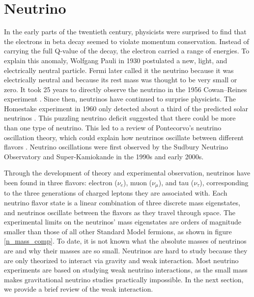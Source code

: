 \section{Neutrino}
In the early parts of the twentieth century, physicists were surprised to find that the electrons in beta decay seemed to violate momentum conservation. Instead of carrying the full Q-value of the decay, the electron carried a range of energies. To explain this anomaly, Wolfgang Pauli in 1930 postulated a new, light, and electrically neutral particle. Fermi later called it the neutrino because it was electrically neutral and because its rest mass was thought to be very small or zero. It took 25 years to directly observe the neutrino in the 1956 Cowan–Reines experiment \cite{PhysRev.92.830}. Since then, neutrinos have continued to surprise physicists. The Homestake experiment in 1960 only detected about a third of the predicted solar neutrinos \cite{Cleveland:1998nv}. This puzzling neutrino deficit suggested that there could be more than one type of neutrino. This led to a review of Pontecorvo's neutrino oscillation theory, which could explain how neutrinos oscillate between different flavors \cite{Pontecorvo:1967fh}. Neutrino oscillations were first observed by the Sudbury Neutrino Observatory \cite{SNO:2001kpb} and Super-Kamiokande \cite{Super_Kamiokande_1998kpq} in the 1990s and early 2000s. 

Through the development of theory and experimental observation, neutrinos have been found in three flavors: electron ($\nu_e$), muon ($\nu_{\mu}$), and tau ($\nu_{\tau}$), corresponding to the three generations of charged leptons they are associated with. Each neutrino flavor state is a linear combination of three discrete mass eigenstates, and neutrinos oscillate between the flavors as they travel through space. The experimental limits on the neutrinos' mass eigenstates are orders of magnitude smaller than those of all other Standard Model fermions, as shown in figure \ref{n_mass_comp}. To date, it is not known what the absolute masses of neutrinos are and why their masses are so small. Neutrinos are hard to study because they are only theorized to interact via gravity and weak interaction. Most neutrino experiments are based on studying weak neutrino interactions, as the small mass makes gravitational neutrino studies practically impossible. In the next section, we provide a brief review of the weak interaction.

